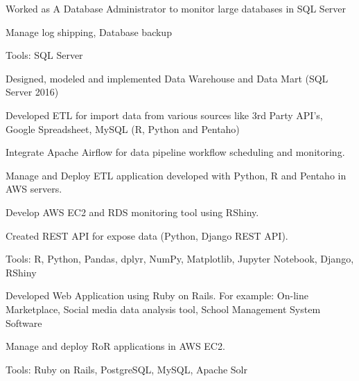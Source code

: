 \documentclass[letterpaper]{deedy-resume} %
\begin{document}
\begin{minipage}[t]{0.66\textwidth}
\sectionspace %


\begin{tightitemize}
\item Worked as A Database Administrator to monitor large databases in SQL Server
\item Manage log shipping, Database backup
\item Tools: SQL Server

\end{tightitemize}

\sectionspace %


\begin{tightitemize}
\item Designed, modeled and implemented Data Warehouse and Data Mart (SQL Server 2016)
\item Developed ETL for import data from various sources like 3rd Party API’s, Google Spreadsheet, MySQL (R, Python and Pentaho)
\item Integrate Apache Airflow for data pipeline workflow scheduling and monitoring.
\item Manage and Deploy ETL application developed with Python, R and Pentaho in AWS servers.
\item Develop AWS EC2 and RDS monitoring tool using RShiny.
\item Created REST API for expose data (Python, Django REST API).
\item Tools: R, Python, Pandas, dplyr, NumPy, Matplotlib, Jupyter Notebook, Django,
RShiny
\end{tightitemize}

\sectionspace %



\begin{tightitemize}
\item Developed Web Application using Ruby on Rails. For example: On-line
Marketplace, Social media data analysis tool, School Management System
Software
\item Manage and deploy RoR applications in AWS EC2.
\item Tools: Ruby on Rails, PostgreSQL, MySQL, Apache Solr
\end{tightitemize}

\sectionspace %

\end{minipage} %
\end{document}
